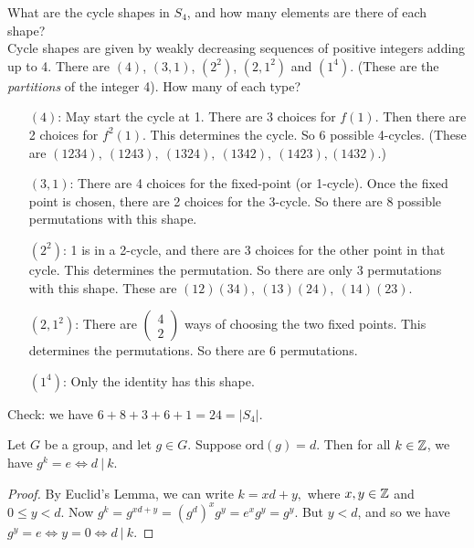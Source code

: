 \documentclass[10pt]{scrartcl}
\begin{document}
\begin{examples}What are the cycle shapes in $S_4$, and how many elements are there of each shape?\\

Cycle shapes are given by weakly decreasing sequences of positive integers adding up to 4. There are $(4)$, $(3,1)$, $(2^2)$, $(2,1^2)$ and $(1^4)$. (These are the \emph{partitions} of the integer 4). How many of each type? \begin{itemize}
 \item[$(4)$:] May start the cycle at 1. There are 3 choices for $f(1)$. Then there are 2 choices for $f^2(1)$. This determines the cycle. So 6 possible 4-cycles. (These are $(1234),~(1243),~(1324),~(1342),~(1423),(1432)$.)
 \item[$(3,1)$:] There are 4 choices for the fixed-point (or 1-cycle).  Once the fixed point is chosen, there are 2 choices for the 3-cycle. So there are 8 possible permutations with this shape.
 \item[$(2^2)$:] 1 is in a 2-cycle, and there are 3 choices for the other point in that cycle. This determines the permutation. So there are only 3 permutations with this shape. These are $(12)(34),~(13)(24),~(14)(23)$.
 \item[$(2,1^2)$:] There are $\left(\begin{smallmatrix}
4 \\ 2	
\end{smallmatrix}\right)$ ways of choosing the two fixed points. This determines the permutations. So there are 6 permutations.
\item[$(1^4)$:] Only the identity has this shape. 
 \end{itemize}
 
 Check: we have $6 + 8 + 3 + 6 + 1 = 24 = |S_4|$.
\end{examples}


 
\begin{proposition} Let $G$ be a group, and let $g \in G$. Suppose ord$(g) = d$. Then for all $k\in \mathbb{Z}$, we have $g^k = e \iff d~|~k $.	
\end{proposition}

 
 \begin{proof}
 By Euclid's Lemma, we can write $k = xd + y,$ where $x,y \in \mathbb{Z}$ and $0 \leq y < d$. Now $g^k = g^{xd + y} = (g^d)^xg^y = e^xg^y = g^y$. But $y < d$, and so we have $g^y = e \iff y =0 \iff d~|~k$.
 \end{proof}
 
\end{document}
